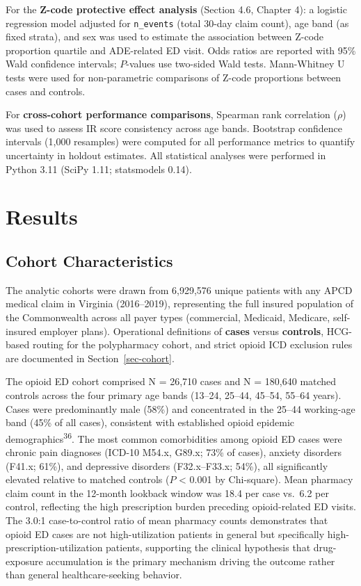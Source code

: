 \documentclass[
  12pt,
]{book}
\begin{document}
For the \textbf{Z-code protective effect analysis} (Section 4.6, Chapter
4): a logistic regression model adjusted for \texttt{n\_events} (total
30-day claim count), age band (as fixed strata), and sex was used to
estimate the association between Z-code proportion quartile and
ADE-related ED visit. Odds ratios are reported with 95\% Wald confidence
intervals; \(P\)-values use two-sided Wald tests. Mann-Whitney U tests
were used for non-parametric comparisons of Z-code proportions between
cases and controls.

For \textbf{cross-cohort performance comparisons}, Spearman rank
correlation (\(\rho\)) was used to assess IR score consistency across
age bands. Bootstrap confidence intervals (1,000 resamples) were
computed for all performance metrics to quantify uncertainty in holdout
estimates. All statistical analyses were performed in Python 3.11 (SciPy
1.11; statsmodels 0.14).

\chapter{Results}\label{sec-results}

\section{Cohort Characteristics}\label{cohort-characteristics}

The analytic cohorts were drawn from 6,929,576 unique patients with any
APCD medical claim in Virginia (2016--2019), representing the full
insured population of the Commonwealth across all payer types
(commercial, Medicaid, Medicare, self-insured employer plans).
Operational definitions of \textbf{cases} versus \textbf{controls},
HCG-based routing for the polypharmacy cohort, and strict opioid ICD
exclusion rules are documented in Section~\ref{sec-cohort}.

The opioid ED cohort comprised N = 26,710 cases and N = 180,640 matched
controls across the four primary age bands (13--24, 25--44, 45--54,
55--64 years). Cases were predominantly male (58\%) and concentrated in
the 25--44 working-age band (45\% of all cases), consistent with
established opioid epidemic demographics\textsuperscript{36}. The most
common comorbidities among opioid ED cases were chronic pain diagnoses
(ICD-10 M54.x, G89.x; 73\% of cases), anxiety disorders (F41.x; 61\%),
and depressive disorders (F32.x--F33.x; 54\%), all significantly
elevated relative to matched controls (\(P\) \textless{} 0.001 by
Chi-square). Mean pharmacy claim count in the 12-month lookback window
was 18.4 per case vs.~6.2 per control, reflecting the high prescription
burden preceding opioid-related ED visits. The 3.0:1 case-to-control
ratio of mean pharmacy counts demonstrates that opioid ED cases are not
high-utilization patients in general but specifically
high-prescription-utilization patients, supporting the clinical
hypothesis that drug-exposure accumulation is the primary mechanism
driving the outcome rather than general healthcare-seeking behavior.
\end{document}
